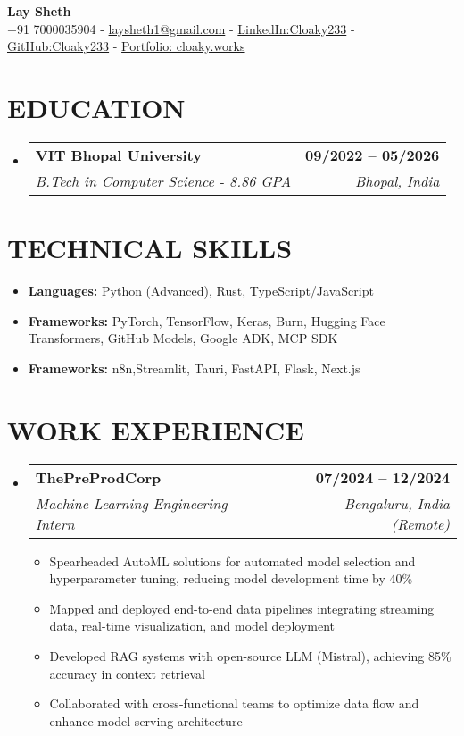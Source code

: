 \documentclass[letterpaper,11pt]{article}
\makeatletter
\def\spaceBelowHeaderContact{-2pt}
\def\spaceBelowEdSec{-8pt}
\def\spaceBelowTechSecContent{-8pt}
\def\spaceBetweenResumeItems{-4pt}
\def\spaceBetweenSubheadings{-1pt}
\def\spaceAfterSubheading{-7pt}
\newcommand{\resumeItem}[1]{
  \item\small{
    {#1 \vspace{\spaceBetweenResumeItems}}
  }
}
\newcommand{\resumeSubheading}[4]{
  \vspace{\spaceBetweenSubheadings}\item
    \begin{tabular*}{1.0\textwidth}[t]{l@{\extracolsep{\fill}}r}
      \textbf{\normalsize#1} & \textbf{\small #2} \\
      \textit{\normalsize#3} & \textit{\small #4} \\
    \end{tabular*}\vspace{\spaceAfterSubheading}
}
\newcommand{\resumeSubHeadingListStart}{\begin{itemize}[leftmargin=0.0in, label={}]}
\newcommand{\resumeSubHeadingListEnd}{\end{itemize}\vspace{\spaceBelowEdSec}}
\newcommand{\resumeItemListStart}{\begin{itemize}[leftmargin=0.1in]}
\newcommand{\resumeItemListEnd}{\end{itemize}\vspace{\spaceBelowTechSecContent}}
\makeatother
\begin{document}
\begin{center}
    {\huge \textbf{Lay Sheth}} \\ \vspace{1pt}
    {+91 7000035904}
    \small{ - }
    {\href{mailto://laysheth1@gmail.com}{laysheth1@gmail.com}}
    \small{ - }
    {\href{https://linkedin.com/in/cloaky233}{LinkedIn:Cloaky233}}
    \small{ - }
    {\href{https://github.com/CLoaKY233}{GitHub:Cloaky233}}
    \small{ - }
    {\href{https://cloaky.works}{Portfolio: cloaky.works}}
    \vspace{\spaceBelowHeaderContact}
\end{center}

\section{{EDUCATION}}
\resumeSubHeadingListStart
    \resumeSubheading
      {VIT Bhopal University}{09/2022 -- 05/2026}
      {B.Tech in Computer Science - 8.86 GPA}{Bhopal, India}
\resumeSubHeadingListEnd

\section{TECHNICAL SKILLS}



\resumeItemListStart
    \resumeItem{
        \textbf{Languages:} Python (Advanced), Rust, TypeScript/JavaScript}
        \resumeItem{\textbf{Frameworks:} PyTorch, TensorFlow, Keras, Burn, Hugging Face Transformers, GitHub Models, Google ADK, MCP SDK}
        \resumeItem{\textbf{Frameworks:} n8n,Streamlit, Tauri, FastAPI, Flask, Next.js}

\resumeItemListEnd
\vspace{-4pt}

\section{{WORK EXPERIENCE}}
\resumeSubHeadingListStart
    \resumeSubheading
      {ThePreProdCorp}{07/2024 -- 12/2024}
      {Machine Learning Engineering Intern}{Bengaluru, India (Remote)}
      \resumeItemListStart
        \resumeItem{Spearheaded AutoML solutions for automated model selection and hyperparameter tuning, reducing model development time by 40\%}
        \resumeItem{Mapped and deployed end-to-end data pipelines integrating streaming data, real-time visualization, and model deployment}
        \resumeItem{Developed RAG systems with open-source LLM (Mistral), achieving 85\% accuracy in context retrieval}
        \resumeItem{Collaborated with cross-functional teams to optimize data flow and enhance model serving architecture}
      \resumeItemListEnd
\resumeSubHeadingListEnd
\end{document}
